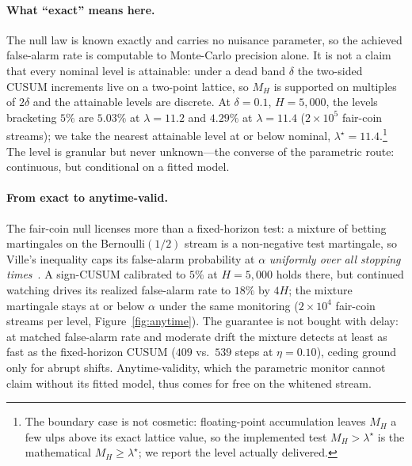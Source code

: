 \documentclass[sigconf,anonymous,review]{acmart}
\theoremstyle{acmdefinition}
\begin{document}
\paragraph{What ``exact'' means here.}
The null law is known exactly and carries no nuisance parameter, so the achieved false-alarm rate is computable to Monte-Carlo precision alone. It is not a claim that every nominal level is attainable: under a dead band $\delta$ the two-sided CUSUM increments live on a two-point lattice, so $M_H$ is supported on multiples of $2\delta$ and the attainable levels are discrete. At $\delta = 0.1$, $H = 5{,}000$, the levels bracketing $5\%$ are $5.03\%$ at $\lambda = 11.2$ and $4.29\%$ at $\lambda = 11.4$ ($2 \times 10^5$ fair-coin streams); we take the nearest attainable level at or below nominal, $\lambda^{\star} = 11.4$.\footnote{The boundary case is not cosmetic: floating-point accumulation leaves $M_H$ a few ulps above its exact lattice value, so the implemented test $M_H > \lambda^{\star}$ is the mathematical $M_H \geq \lambda^{\star}$; we report the level actually delivered.} The level is granular but never unknown---the converse of the parametric route: continuous, but conditional on a fitted model.

\paragraph{From exact to anytime-valid.} The fair-coin null licenses more than a fixed-horizon test: a mixture of betting martingales on the Bernoulli$(1/2)$ stream is a non-negative test martingale, so Ville's inequality caps its false-alarm probability at $\alpha$ \emph{uniformly over all stopping times}~\cite{ville_1939, ramdas_2023}. A sign-CUSUM calibrated to $5\%$ at $H = 5{,}000$ holds there, but continued watching drives its realized false-alarm rate to $18\%$ by $4H$; the mixture martingale stays at or below $\alpha$ under the same monitoring ($2\times10^4$ fair-coin streams per level, Figure~\ref{fig:anytime}). The guarantee is not bought with delay: at matched false-alarm rate and moderate drift the mixture detects at least as fast as the fixed-horizon CUSUM ($409$ vs.\ $539$ steps at $\eta = 0.10$), ceding ground only for abrupt shifts. Anytime-validity, which the parametric monitor cannot claim without its fitted model, thus comes for free on the whitened stream.
\end{document}
